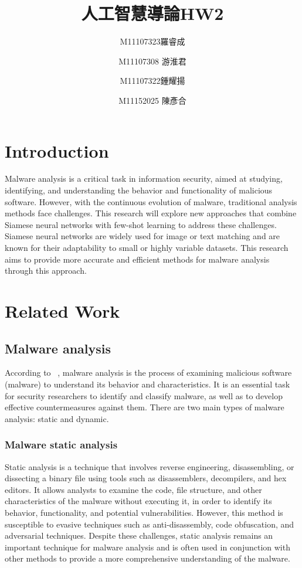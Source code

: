 \documentclass{article}
\title{人工智慧導論HW2}
\author{M11107323羅睿成 \and M11107308 游淮君 \and M11107322鍾耀揚 \and M11152025 陳彥合}
\begin{document}
\maketitle
\section{Introduction}
Malware analysis is a critical task in information security, aimed at studying, identifying, and understanding the behavior and functionality of malicious software. 
However, with the continuous evolution of malware, traditional analysis methods face challenges. 
This research will explore new approaches that combine Siamese neural networks with few-shot learning to address these challenges. 
Siamese neural networks are widely used for image or text matching and are known for their adaptability to small or highly variable datasets. 
This research aims to provide more accurate and efficient methods for malware analysis through this approach.

\section{Related Work}
\subsection{Malware analysis}
According to ~\cite{ref1}, malware analysis is the process of examining malicious software (malware) to understand its behavior and characteristics. It is an essential task for security researchers to identify and classify malware, as well as to develop effective countermeasures against them. There are two main types of malware analysis: static and dynamic.
\subsubsection{Malware static analysis}
Static analysis is a technique that involves reverse engineering, disassembling, or dissecting a binary file using tools such as disassemblers, decompilers, and hex editors. It allows analysts to examine the code, file structure, and other characteristics of the malware without executing it, in order to identify its behavior, functionality, and potential vulnerabilities. However, this method is susceptible to evasive techniques such as anti-disassembly, code obfuscation, and adversarial techniques. Despite these challenges, static analysis remains an important technique for malware analysis and is often used in conjunction with other methods to provide a more comprehensive understanding of the malware.
\end{document}
